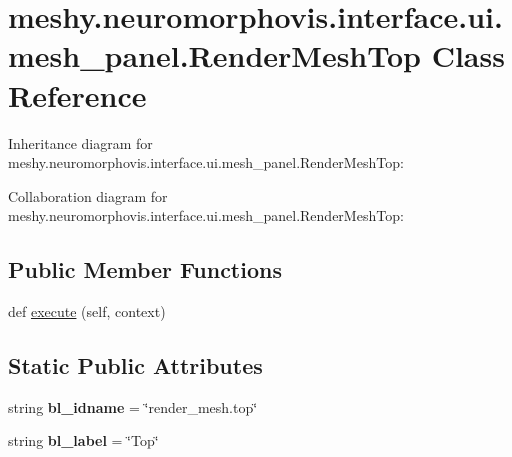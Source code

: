\hypertarget{classmeshy_1_1neuromorphovis_1_1interface_1_1ui_1_1mesh__panel_1_1RenderMeshTop}{}\section{meshy.\+neuromorphovis.\+interface.\+ui.\+mesh\+\_\+panel.\+Render\+Mesh\+Top Class Reference}
\label{classmeshy_1_1neuromorphovis_1_1interface_1_1ui_1_1mesh__panel_1_1RenderMeshTop}


Inheritance diagram for meshy.\+neuromorphovis.\+interface.\+ui.\+mesh\+\_\+panel.\+Render\+Mesh\+Top\+:


Collaboration diagram for meshy.\+neuromorphovis.\+interface.\+ui.\+mesh\+\_\+panel.\+Render\+Mesh\+Top\+:
\subsection*{Public Member Functions}
\begin{DoxyCompactItemize}
\item 
def \hyperlink{classmeshy_1_1neuromorphovis_1_1interface_1_1ui_1_1mesh__panel_1_1RenderMeshTop_a7715e749542a2537120675216057bb1a}{execute} (self, context)
\end{DoxyCompactItemize}
\subsection*{Static Public Attributes}
\begin{DoxyCompactItemize}
\item 
string {\bfseries bl\+\_\+idname} = \char`\"{}render\+\_\+mesh.\+top\char`\"{}\hypertarget{classmeshy_1_1neuromorphovis_1_1interface_1_1ui_1_1mesh__panel_1_1RenderMeshTop_abddc8b8bfcb40919555bd655bfb2c682}{}\label{classmeshy_1_1neuromorphovis_1_1interface_1_1ui_1_1mesh__panel_1_1RenderMeshTop_abddc8b8bfcb40919555bd655bfb2c682}

\item 
string {\bfseries bl\+\_\+label} = \char`\"{}Top\char`\"{}\hypertarget{classmeshy_1_1neuromorphovis_1_1interface_1_1ui_1_1mesh__panel_1_1RenderMeshTop_ad401005b5afe525235a49a2cc743fda1}{}\label{classmeshy_1_1neuromorphovis_1_1interface_1_1ui_1_1mesh__panel_1_1RenderMeshTop_ad401005b5afe525235a49a2cc743fda1}

\end{DoxyCompactItemize}


